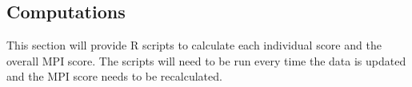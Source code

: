 \documentclass[SDSUThesis.tex]{subfiles}
\begin{document}
\subsection{Computations}
    This section will provide R scripts to calculate each individual score and the overall 
    MPI score. The scripts will need to be run every time the data is updated and the MPI
    score needs to be recalculated.

\end{document}
